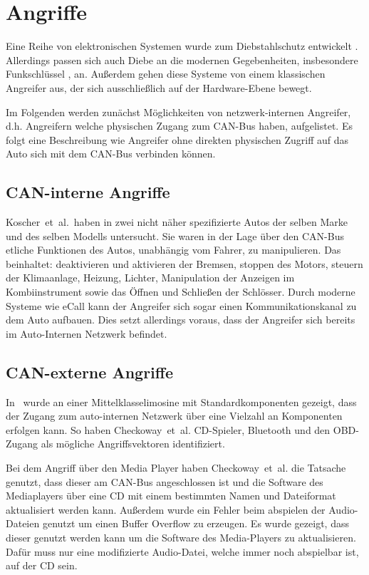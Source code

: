 \chapter{Angriffe}\label{ch:attack}

Eine Reihe von elektronischen Systemen wurde zum Diebstahlschutz entwickelt
\cite{Song2008,Turner1999,Hwang1997}. Allerdings passen sich auch Diebe an die
modernen Gegebenheiten, insbesondere Funkschlüssel \cite{Lee2014}, an. Außerdem
gehen diese Systeme von einem klassischen Angreifer aus, der sich
ausschließlich auf der Hardware-Ebene bewegt.

Im Folgenden werden zunächst Möglichkeiten von netzwerk-internen Angreifer,
d.h. Angreifern welche physischen Zugang zum CAN-Bus haben, aufgelistet. Es
folgt eine Beschreibung wie Angreifer ohne direkten physischen Zugriff auf das
Auto sich mit dem CAN-Bus verbinden können.


\section{CAN-interne Angriffe}
Koscher~et~al.~haben in \cite{Koscher2010} zwei nicht näher spezifizierte Autos
der selben Marke und des selben Modells untersucht. Sie waren in der Lage über
den CAN-Bus etliche Funktionen des Autos, unabhängig vom Fahrer, zu
manipulieren. Das beinhaltet: deaktivieren und aktivieren der Bremsen, stoppen
des Motors, steuern der Klimaanlage, Heizung, Lichter, Manipulation der
Anzeigen im Kombiinstrument sowie das Öffnen und Schließen der Schlösser. Durch
moderne Systeme wie eCall kann der Angreifer sich sogar einen
Kommunikationskanal zu dem Auto aufbauen. Dies setzt allerdings voraus, dass
der Angreifer sich bereits im Auto-Internen Netzwerk befindet.

\section{CAN-externe Angriffe}
In~\cite{Checkoway2011} wurde an einer Mittelklasselimosine mit
Standardkomponenten gezeigt, dass der Zugang zum auto-internen Netzwerk über
eine Vielzahl an Komponenten erfolgen kann. So haben Checkoway~et~al.
CD-Spieler, Bluetooth und den OBD-Zugang als mögliche Angriffsvektoren
identifiziert.

Bei dem Angriff über den Media Player haben Checkoway~et~al. die Tatsache
genutzt, dass dieser am CAN-Bus angeschlossen ist und die Software des
Mediaplayers über eine CD mit einem bestimmten Namen und Dateiformat
aktualisiert werden kann. Außerdem wurde ein Fehler beim abspielen der
Audio-Dateien genutzt um einen Buffer Overflow zu erzeugen. Es wurde gezeigt,
dass dieser genutzt werden kann um die Software des Media-Players zu
aktualisieren. Dafür muss nur eine modifizierte Audio-Datei, welche immer noch
abspielbar ist, auf der CD sein.

